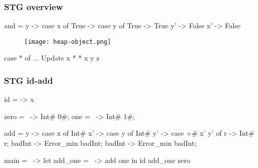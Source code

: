 \documentclass[bigger]{beamer}
\begin{document}
\begin{frame}[fragile]
\frametitle{STG overview}
\begin{center}

	\begin{minipage}{0.30\textwidth}
		\vspace{-3cm}
		\begin{haskellcode}
			and = \x y -> case x of
			 True -> case y of
			  True -> True
			   y' -> False
			 x' -> False
		\end{haskellcode}
	\end{minipage}
	\hfill
	\begin{minipage}{0.30\textwidth}
		\vspace{0.75cm}
		\begin{figure}
			\texttt{[image: heap-object.png]}
		\end{figure}
	\end{minipage}
	\hfill
	\begin{minipage}{0.30\textwidth}
		\vspace{5cm}
		\begin{haskellcode}
			case * of {...}
			Update x *
			* x y z
		\end{haskellcode}
	\end{minipage}

\end{center}
\end{frame}


\begin{frame}[fragile]
\frametitle{STG id-add}
\begin{center}

	\begin{haskellcode}
		id = \x -> x
	\end{haskellcode}
	\pause
	\begin{haskellcode}
		zero = \ -> Int# 0#;
		one  = \ -> Int# 1#;
	\end{haskellcode}
	\pause
	\begin{haskellcode}
		add = \x y -> case x of
		  Int# x' -> case y of
		    Int# y' -> case +# x' y' of
		      r -> Int# r;
		    badInt -> Error_min badInt;
		  badInt -> Error_min badInt;
	\end{haskellcode}
	\pause
	\begin{haskellcode}
		main = \ -> let add_one = \ -> add one
		            in id add_one zero
	\end{haskellcode}

\end{center}
\end{frame}
\end{document}
